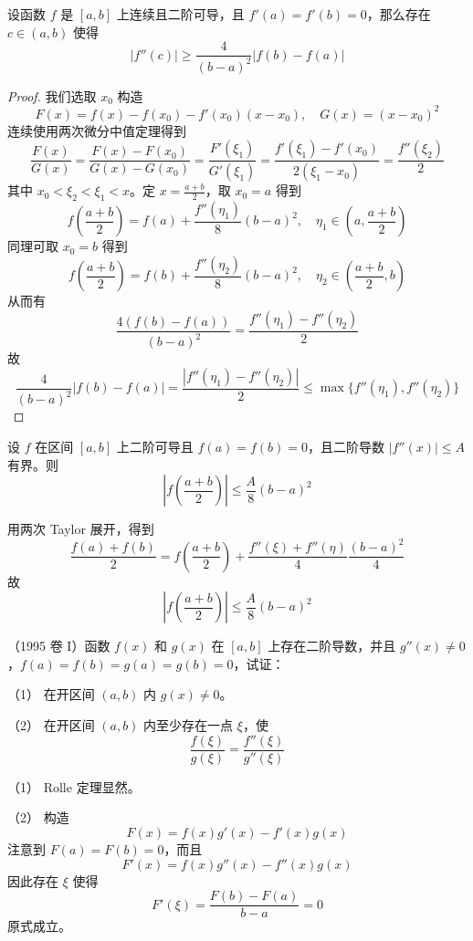 \begin{problem}[000042]
设函数 $f$ 是 $[a,b]$ 上连续且二阶可导，且 $f'(a) = f'(b) = 0$，那么存在 $c \in (a,b)$ 使得
\[ |f''(c)| \geqslant \frac{4}{(b-a)^2} |f(b) - f(a)| \]
\end{problem}

\begin{proof}
	我们选取 $x_0$ 构造
	\[ F(x) = f(x) - f(x_0) - f'(x_0)(x-x_0) , \quad G(x) = (x-x_0)^2 \]
	连续使用两次微分中值定理得到
	\[ \frac{F(x)}{G(x)} = \frac{F(x) - F(x_0)}{G(x) - G(x_0)} = \frac{F'(\xi_1)}{G'(\xi_1)} = \frac{f'(\xi_1) - f'(x_0)}{2 (\xi_1 - x_0)} = \frac{f''(\xi_2)}{2} \]
	其中 $x_0 < \xi_2 < \xi_1 < x$。定 $x=\frac{a+b}{2}$，取 $x_0 = a$ 得到
	\[ f\left(\frac{a+b}{2}\right) = f(a) + \frac{f''(\eta_1)}{8} (b-a)^2, \quad \eta_1 \in \left(a, \frac{a+b}{2}\right) \]
	同理可取 $x_0 = b$ 得到
	\[ f\left(\frac{a+b}{2}\right) = f(b) + \frac{f''(\eta_2)}{8} (b-a)^2, \quad \eta_2 \in \left(\frac{a+b}{2}, b\right) \]
	从而有
	\[ \frac{4(f(b) - f(a))}{(b-a)^2} = \frac{f''(\eta_1) - f''(\eta_2)}{2} \]
	故
	\[ \frac{4}{(b-a)^2}|f(b) - f(a)| = \frac{|f''(\eta_1) - f''(\eta_2)|}{2} \leqslant \max\{f''(\eta_1), f''(\eta_2)\} \]
\end{proof}

\begin{problem}[000043]
设 $f$ 在区间 $[a, b]$ 上二阶可导且 $f(a) = f(b) = 0$，且二阶导数 $|f''(x)| \leqslant A$ 有界。则
\[ \left| f\left(\frac{a+b}{2}\right) \right| \leqslant \frac{A}{8}(b- a)^2 \]
\end{problem}

\begin{solution}
	用两次 Taylor 展开，得到
	\[ \frac{f(a) + f(b)}{2} = f\left(\frac{a+b}{2}\right) + \frac{f''(\xi) + f''(\eta)}{4}\frac{(b - a)^2}{4} \]
	故
	\[ \left| f\left(\frac{a+b}{2}\right) \right| \leqslant \frac{A}{8}(b- a)^2 \]
\end{solution}

\begin{problem}[000064]
（1995 卷 I）函数 $f(x)$ 和 $g(x)$ 在 $[a,b]$ 上存在二阶导数，并且 $g''(x) \neq 0$，$f(a) = f(b) = g(a) = g(b) = 0$，试证：

（1） 在开区间 $(a, b)$ 内 $g(x) \neq 0$。

（2） 在开区间 $(a, b)$ 内至少存在一点 $\xi$，使
\[ \frac{f(\xi)}{g(\xi)} = \frac{f''(\xi)}{g''(\xi)} \]
\end{problem}

\begin{solution}
	（1） Rolle 定理显然。

	（2） 构造
	\[ F(x) = f(x) g'(x) - f'(x) g(x) \]
	注意到 $F(a) = F(b) = 0$，而且
	\[ F'(x) = f(x) g''(x) - f''(x) g(x) \]
	因此存在 $\xi$ 使得
	\[ F'(\xi) = \frac{F(b) - F(a)}{b - a} = 0 \]
	原式成立。
\end{solution}

